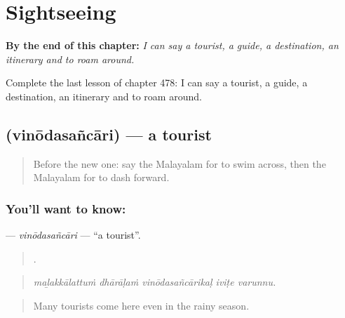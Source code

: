 
\chapter{Sightseeing}
\label{ch:ml-sightseeing}

\begin{chapteropening}
\textbf{By the end of this chapter:} \emph{I can say a tourist, a guide, a destination, an itinerary and to roam around.}

Complete the last lesson of chapter 478: I can say a tourist, a guide, a destination, an itinerary and to roam around.
\end{chapteropening}

\section[\texorpdfstring{\ml{വിനോദസഞ്ചാരി} (vinōdasañcāri)}{വിനോദസഞ്ചാരി (vinōdasañcāri)}]{ (vinōdasañcāri) — a tourist}

\label{lesson:ML-C478-vinodasancari}



\begin{quote}
Before the new one: say the Malayalam for to swim across, then the Malayalam for to dash forward.
\end{quote}

\subsection*{You'll want to know: }
\textbf{} — \emph{vinōdasañcāri} — \textquotedblleft{}a tourist\textquotedblright{}.

\begin{quote}
    .
\end{quote}

\begin{quote}
\emph{maḻakkālattuṁ dhārāḷaṁ vinōdasañcārikaḷ iviṭe varunnu.}
\end{quote}

\begin{quote}
Many tourists come here even in the rainy season.
\end{quote}


